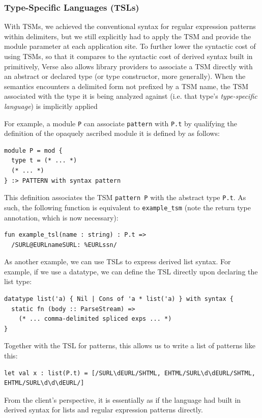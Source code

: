 \subsubsection{Type-Specific Languages (TSLs)}\label{sec:tsls}
With TSMs, we achieved the conventional syntax for regular expression patterns within delimiters, but we still explicitly had to apply the TSM and provide the module parameter at each application site. To further lower the syntactic cost of using TSMs, so that it compares to the syntactic cost of derived syntax built in primitively, Verse also allows library providers to associate a TSM directly with an abstract or declared type (or type constructor, more generally). When the semantics encounters a delimited form not prefixed by a TSM name, the TSM associated with the type it is being analyzed against (i.e. that type's \emph{type-specific language}) is implicitly applied

For example, a module \lstinline{P} can associate \lstinline{pattern} with \lstinline{P.t} by qualifying the definition of the opaquely ascribed module it is defined by as follows:
\begin{lstlisting}[numbers=none]
module P = mod {
  type t = (* ... *)
  (* ... *)
} :> PATTERN with syntax pattern
\end{lstlisting}
This definition associates the TSM \lstinline{pattern P} with the abstract type \lstinline{P.t}. As such, the following function is equivalent to \lstinline{example_tsm} (note the return type annotation, which is now necessary):
\begin{lstlisting}[numbers=none]
fun example_tsl(name : string) : P.t => 
  /SURL@EURLnameSURL: %EURLssn/
\end{lstlisting}

As another example, we can use TSLs to express derived list syntax. For example, if we use a datatype, we can define the TSL directly upon declaring the list type:
\begin{lstlisting}[numbers=none]
datatype list('a) { Nil | Cons of 'a * list('a) } with syntax {
  static fn (body :: ParseStream) => 
    (* ... comma-delimited spliced exps ... *)
}
\end{lstlisting}
Together with the TSL for patterns, this allows us to write a list of patterns like this:
\begin{lstlisting}[numbers=none]
let val x : list(P.t) = [/SURL\dEURL/SHTML, EHTML/SURL\d\dEURL/SHTML, EHTML/SURL\d\d\dEURL/]
\end{lstlisting}
From the client's perspective, it is essentially as if the language had built in derived syntax for lists and regular expression patterns directly.%

